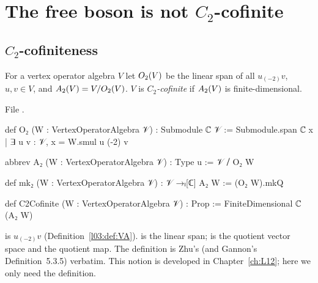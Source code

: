 \section{The free boson is not \texorpdfstring{$C_2$}{C2}-cofinite}\label{l05:sec:c2}

\subsection{\texorpdfstring{$C_2$}{C2}-cofiniteness}

\begin{definition}\label{l05:def:C2}
For a vertex operator algebra $V$ let $O_2(V)$ be the linear span of all $u_{(-2)}v$, $u,v\in V$, and
$A_2(V)=V/O_2(V)$. $V$ is \emph{$C_2$-cofinite} if $A_2(V)$ is finite-dimensional.
\end{definition}

\noindent File .
\begin{leancode}
def O₂ (W : VertexOperatorAlgebra 𝒱) : Submodule ℂ 𝒱 :=
  Submodule.span ℂ {x | ∃ u v : 𝒱, x = W.smul u (-2) v}

abbrev A₂ (W : VertexOperatorAlgebra 𝒱) : Type u := 𝒱 ⧸ O₂ W

def mk₂ (W : VertexOperatorAlgebra 𝒱) : 𝒱 →ₗ[ℂ] A₂ W := (O₂ W).mkQ

def C2Cofinite (W : VertexOperatorAlgebra 𝒱) : Prop := FiniteDimensional ℂ (A₂ W)
\end{leancode}

\begin{dictionary}
 is $u_{(-2)}v$ (Definition~\ref{l03:def:VA}).  is the linear
span;  is the quotient vector space and  the quotient map. The definition is Zhu's
(and Gannon's Definition~5.3.5) verbatim. This notion is developed in Chapter~\ref{ch:L12}; here we only need
the definition.
\end{dictionary}

